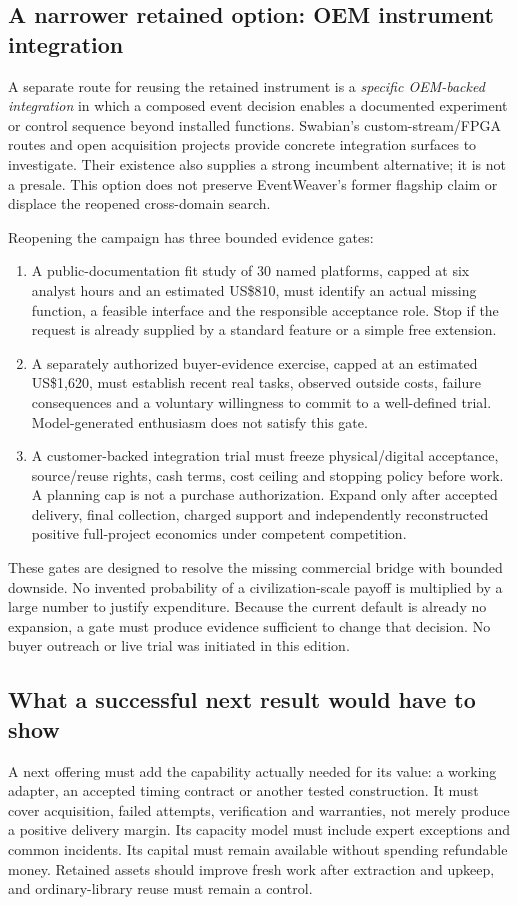 

\subsection{A narrower retained option: OEM instrument integration}
A separate route for reusing the retained instrument is a \emph{specific OEM-backed integration} in which a composed event decision enables a documented experiment or control sequence beyond installed functions. Swabian's custom-stream/FPGA routes and open acquisition projects provide concrete integration surfaces to investigate. Their existence also supplies a strong incumbent alternative; it is not a presale. This option does not preserve EventWeaver's former flagship claim or displace the reopened cross-domain search.

Reopening the campaign has three bounded evidence gates:
\begin{enumerate}
\item A public-documentation fit study of 30 named platforms, capped at six analyst hours and an estimated US\$810, must identify an actual missing function, a feasible interface and the responsible acceptance role. Stop if the request is already supplied by a standard feature or a simple free extension.
\item A separately authorized buyer-evidence exercise, capped at an estimated US\$1,620, must establish recent real tasks, observed outside costs, failure consequences and a voluntary willingness to commit to a well-defined trial. Model-generated enthusiasm does not satisfy this gate.
\item A customer-backed integration trial must freeze physical/digital acceptance, source/reuse rights, cash terms, cost ceiling and stopping policy before work. A planning cap is not a purchase authorization. Expand only after accepted delivery, final collection, charged support and independently reconstructed positive full-project economics under competent competition.
\end{enumerate}
These gates are designed to resolve the missing commercial bridge with bounded downside. No invented probability of a civilization-scale payoff is multiplied by a large number to justify expenditure. Because the current default is already no expansion, a gate must produce evidence sufficient to change that decision. No buyer outreach or live trial was initiated in this edition.

\subsection{What a successful next result would have to show}
A next offering must add the capability actually needed for its value: a working adapter, an accepted timing contract or another tested construction. It must cover acquisition, failed attempts, verification and warranties, not merely produce a positive delivery margin. Its capacity model must include expert exceptions and common incidents. Its capital must remain available without spending refundable money. Retained assets should improve fresh work after extraction and upkeep, and ordinary-library reuse must remain a control.

